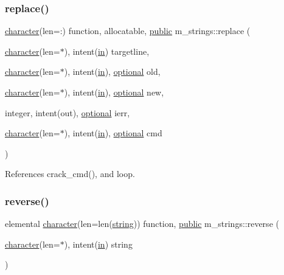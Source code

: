 \subsubsection{\texorpdfstring{replace()}{replace()}}
{\footnotesize\ttfamily \hyperlink{option__stopwatch_83_8txt_abd4b21fbbd175834027b5224bfe97e66}{character}(len=\+:) function, allocatable, \hyperlink{M__stopwatch_83_8txt_a2f74811300c361e53b430611a7d1769f}{public} m\+\_\+strings\+::replace (\begin{DoxyParamCaption}\item[{\hyperlink{option__stopwatch_83_8txt_abd4b21fbbd175834027b5224bfe97e66}{character}(len=$\ast$), intent(\hyperlink{M__journal_83_8txt_afce72651d1eed785a2132bee863b2f38}{in})}]{targetline,  }\item[{\hyperlink{option__stopwatch_83_8txt_abd4b21fbbd175834027b5224bfe97e66}{character}(len=$\ast$), intent(\hyperlink{M__journal_83_8txt_afce72651d1eed785a2132bee863b2f38}{in}), \hyperlink{option__stopwatch_83_8txt_aa4ece75e7acf58a4843f70fe18c3ade5}{optional}}]{old,  }\item[{\hyperlink{option__stopwatch_83_8txt_abd4b21fbbd175834027b5224bfe97e66}{character}(len=$\ast$), intent(\hyperlink{M__journal_83_8txt_afce72651d1eed785a2132bee863b2f38}{in}), \hyperlink{option__stopwatch_83_8txt_aa4ece75e7acf58a4843f70fe18c3ade5}{optional}}]{new,  }\item[{integer, intent(out), \hyperlink{option__stopwatch_83_8txt_aa4ece75e7acf58a4843f70fe18c3ade5}{optional}}]{ierr,  }\item[{\hyperlink{option__stopwatch_83_8txt_abd4b21fbbd175834027b5224bfe97e66}{character}(len=$\ast$), intent(\hyperlink{M__journal_83_8txt_afce72651d1eed785a2132bee863b2f38}{in}), \hyperlink{option__stopwatch_83_8txt_aa4ece75e7acf58a4843f70fe18c3ade5}{optional}}]{cmd }\end{DoxyParamCaption})}



References crack\+\_\+cmd(), and loop.

\mbox{\label{namespacem__strings_ab3e5e7af9e9594fdb544f82736a26f17}} 
\subsubsection{\texorpdfstring{reverse()}{reverse()}}
{\footnotesize\ttfamily elemental \hyperlink{option__stopwatch_83_8txt_abd4b21fbbd175834027b5224bfe97e66}{character}(len=len(\hyperlink{what__overview_81_8txt_a74cb7e955273b9f9157b4f0c18a38849}{string})) function, \hyperlink{M__stopwatch_83_8txt_a2f74811300c361e53b430611a7d1769f}{public} m\+\_\+strings\+::reverse (\begin{DoxyParamCaption}\item[{\hyperlink{option__stopwatch_83_8txt_abd4b21fbbd175834027b5224bfe97e66}{character}(len=$\ast$), intent(\hyperlink{M__journal_83_8txt_afce72651d1eed785a2132bee863b2f38}{in})}]{string }\end{DoxyParamCaption})}



